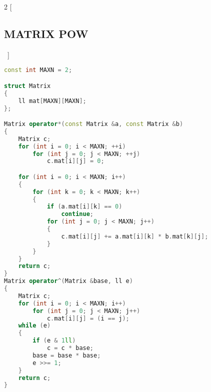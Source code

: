 \documentclass[leter]{amsart}
\begin{document}
\begin{multicols}{2}
[\subsection{MATRIX POW}\ ]
\begin{lstlisting}[language=C++]
const int MAXN = 2;

struct Matrix
{
    ll mat[MAXN][MAXN];
};

Matrix operator*(const Matrix &a, const Matrix &b)
{
    Matrix c;
    for (int i = 0; i < MAXN; ++i)
        for (int j = 0; j < MAXN; ++j)
            c.mat[i][j] = 0;

    for (int i = 0; i < MAXN; i++)
    {
        for (int k = 0; k < MAXN; k++)
        {
            if (a.mat[i][k] == 0)
                continue;
            for (int j = 0; j < MAXN; j++)
            {
                c.mat[i][j] += a.mat[i][k] * b.mat[k][j];
            }
        }
    }
    return c;
}
Matrix operator^(Matrix &base, ll e)
{
    Matrix c;
    for (int i = 0; i < MAXN; i++)
        for (int j = 0; j < MAXN; j++)
            c.mat[i][j] = (i == j);
    while (e)
    {
        if (e & 1ll)
            c = c * base;
        base = base * base;
        e >>= 1;
    }
    return c;
}

\end{lstlisting}
\end{multicols}
\end{document}
